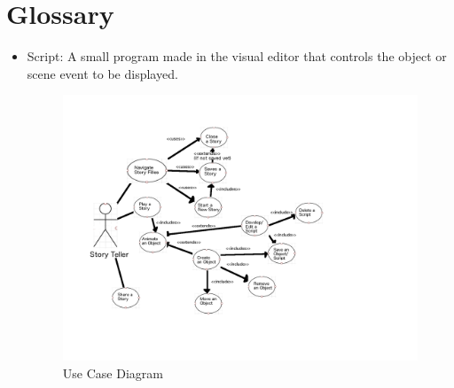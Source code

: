 \documentclass[12pt]{article}
\begin{document}
\section{Glossary}
\begin{itemize}
\item Script:  A small program made in the visual editor that controls the object or scene event to be displayed.


\begin{figure}[ht!]
\centering
\includegraphics[width=200mm]{FlowChart.png}
\caption{Use Case Diagram}
\label{overflow}
\end{figure}






\end{itemize}
\end{document}

